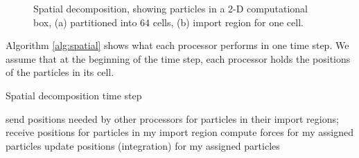 \begin{figure}[htbp]
\begin{center}
 \qquad
{}
\caption{Spatial decomposition, showing particles in a 2-D computational box, (a) partitioned into
64 cells, (b) import region for one cell.}
\label{fig:spatial}
\end{center}
\end{figure}

Algorithm \ref{alg:spatial} shows what each processor performs in one time step.
We assume that at the beginning of the time step, each processor holds the positions
of the particles in its cell.
\begin{algorithm}
\caption{Spatial decomposition time step}
\label{alg:spatial}
\begin{algorithmic}[1]
\STATE send positions needed by other processors for particles in their import regions;
receive positions for particles in my import region
\STATE compute forces for my assigned particles
\STATE update positions (integration) for my assigned particles
\end{algorithmic}
\end{algorithm}

